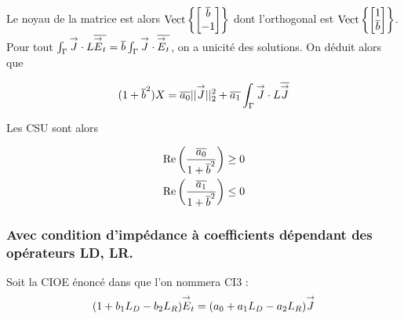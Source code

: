 		Le noyau de la matrice est alors $\operatorname{Vect}\left\lbrace\begin{bmatrix}{\overline{b}}\\-1\end{bmatrix}\right\rbrace$ dont l'orthogonal est  $\operatorname{Vect}\left\lbrace\begin{bmatrix}1\\{\overline{b}}\end{bmatrix}\right\rbrace$.
		Pour tout $\int_\Gamma {\overset{\rightarrow}{J}}\cdot L{\overline{{\overset{\rightarrow}{E}}_t}} = {\overline{b}} \int_\Gamma {\overset{\rightarrow}{J}} \cdot {\overline{{\overset{\rightarrow}{E}}_t}} $, on a unicité des solutions. On déduit alors que

		\[
			(1 + {\overline{b}}^2) X = {\overline{a_0}} ||{\overset{\rightarrow}{J}}||_2^2 + {\overline{a_1}}\int_\Gamma {\overset{\rightarrow}{J}} \cdot L{\overline{{\overset{\rightarrow}{J}}}}
		\]

		Les CSU sont alors

		\begin{align}
			\operatorname{Re}\left(\dfrac{{\overline{a_0}}}{1 + {\overline{b}}^2}\right) &\ge 0 \\
			\operatorname{Re}\left(\dfrac{{\overline{a_1}}}{1 + {\overline{b}}^2}\right) &\le 0
		\end{align}






		\subsubsection{Avec condition d'impédance à coefficients dépendant des opérateurs LD, LR.}

			Soit la CIOE énoncé dans \cite{soudais_3d_2017} que l'on nommera CI3 :
			\begin{equation}
				\label{eq:unicite:ci3:ci3}
				( 1 + b_1 L_D - b_2 L_R){\overset{\rightarrow}{E}}_t = (a_0 + a_1 L_D - a_2 L_R ) {\overset{\rightarrow}{J}}
			\end{equation}

